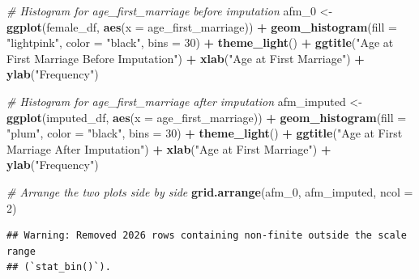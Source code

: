 \documentclass[
]{article}
\newenvironment{Shaded}{\begin{snugshade}}{\end{snugshade}}
\newcommand{\AttributeTok}[1]{\textcolor[rgb]{0.13,0.29,0.53}{#1}}
\newcommand{\CommentTok}[1]{\textcolor[rgb]{0.56,0.35,0.01}{\textit{#1}}}
\newcommand{\DecValTok}[1]{\textcolor[rgb]{0.00,0.00,0.81}{#1}}
\newcommand{\FunctionTok}[1]{\textcolor[rgb]{0.13,0.29,0.53}{\textbf{#1}}}
\newcommand{\NormalTok}[1]{#1}
\newcommand{\OtherTok}[1]{\textcolor[rgb]{0.56,0.35,0.01}{#1}}
\newcommand{\SpecialCharTok}[1]{\textcolor[rgb]{0.81,0.36,0.00}{\textbf{#1}}}
\newcommand{\StringTok}[1]{\textcolor[rgb]{0.31,0.60,0.02}{#1}}
\begin{document}
\begin{Shaded}
\begin{Highlighting}[]
\CommentTok{\# Histogram for \textquotesingle{}age\_first\_marriage\textquotesingle{} before imputation}
\NormalTok{afm\_0 }\OtherTok{\textless{}{-}} \FunctionTok{ggplot}\NormalTok{(female\_df, }\FunctionTok{aes}\NormalTok{(}\AttributeTok{x =}\NormalTok{ age\_first\_marriage)) }\SpecialCharTok{+} 
  \FunctionTok{geom\_histogram}\NormalTok{(}\AttributeTok{fill =} \StringTok{"lightpink"}\NormalTok{, }\AttributeTok{color =} \StringTok{"black"}\NormalTok{, }\AttributeTok{bins =} \DecValTok{30}\NormalTok{) }\SpecialCharTok{+}
  \FunctionTok{theme\_light}\NormalTok{() }\SpecialCharTok{+}
  \FunctionTok{ggtitle}\NormalTok{(}\StringTok{"Age at First Marriage Before Imputation"}\NormalTok{) }\SpecialCharTok{+}
  \FunctionTok{xlab}\NormalTok{(}\StringTok{"Age at First Marriage"}\NormalTok{) }\SpecialCharTok{+}
  \FunctionTok{ylab}\NormalTok{(}\StringTok{"Frequency"}\NormalTok{)}

\CommentTok{\# Histogram for \textquotesingle{}age\_first\_marriage\textquotesingle{} after imputation}
\NormalTok{afm\_imputed }\OtherTok{\textless{}{-}} \FunctionTok{ggplot}\NormalTok{(imputed\_df, }\FunctionTok{aes}\NormalTok{(}\AttributeTok{x =}\NormalTok{ age\_first\_marriage)) }\SpecialCharTok{+} 
  \FunctionTok{geom\_histogram}\NormalTok{(}\AttributeTok{fill =} \StringTok{"plum"}\NormalTok{, }\AttributeTok{color =} \StringTok{"black"}\NormalTok{, }\AttributeTok{bins =} \DecValTok{30}\NormalTok{) }\SpecialCharTok{+}
  \FunctionTok{theme\_light}\NormalTok{() }\SpecialCharTok{+}
  \FunctionTok{ggtitle}\NormalTok{(}\StringTok{"Age at First Marriage After Imputation"}\NormalTok{) }\SpecialCharTok{+}
  \FunctionTok{xlab}\NormalTok{(}\StringTok{"Age at First Marriage"}\NormalTok{) }\SpecialCharTok{+}
  \FunctionTok{ylab}\NormalTok{(}\StringTok{"Frequency"}\NormalTok{)}

\CommentTok{\# Arrange the two plots side by side}
\FunctionTok{grid.arrange}\NormalTok{(afm\_0, afm\_imputed, }\AttributeTok{ncol =} \DecValTok{2}\NormalTok{)}
\end{Highlighting}
\end{Shaded}

\begin{verbatim}
## Warning: Removed 2026 rows containing non-finite outside the scale range
## (`stat_bin()`).
\end{verbatim}
\end{document}

